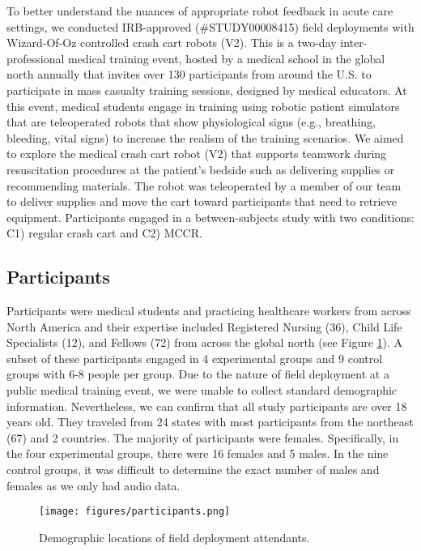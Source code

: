To better understand the nuances of appropriate robot feedback in acute care settings, we conducted IRB-approved (\#STUDY00008415) field deployments with Wizard-Of-Oz controlled crash cart robots (V2). 
This is a two-day inter-professional medical training event, hosted by a medical school in the global north annually that invites over 130 participants from around the U.S. to participate in mass casualty training sessions, designed by medical educators. 
At this event, medical students engage in training using robotic patient simulators that are teleoperated robots that show physiological signs (e.g., breathing, bleeding, vital signs) to increase the realism of the training scenarios. 
We aimed to explore the medical crash cart robot (V2) that supports teamwork during resuscitation procedures at the patient’s bedside such as delivering supplies or recommending materials. 
The robot was teleoperated by a member of our team to deliver supplies and move the cart toward participants that need to retrieve equipment. 
Participants engaged in a between-subjects study with two conditions: C1) regular crash cart and C2) MCCR.



\subsection{Participants} 

Participants were medical students and practicing healthcare workers from across North America and their expertise included Registered Nursing (36), Child Life Specialists (12), and Fellows (72) from across the global north (see Figure \ref{fig:participants}).
A subset of these participants engaged in 4 experimental groups and 9 control groups with 6-8 people per group.
Due to the nature of field deployment at a public medical training event, we were unable to collect standard demographic information.
Nevertheless, we can confirm that all study participants are over 18 years old.
They traveled from 24 states with most participants from the northeast (67) and 2 countries. 
The majority of participants were females. Specifically, in the four experimental groups, there were 16 females and 5 males. In the nine control groups, it was difficult to determine the exact number of males and females as we only had audio data.



\begin{figure}[t]
    \centering
 \texttt{[image: figures/participants.png]}
    \caption{Demographic locations of field deployment attendants.} 
    \label{fig:participants}
\end{figure}




